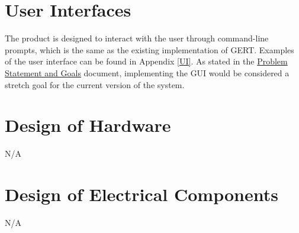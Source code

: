 \documentclass[12pt, titlepage]{article}
\begin{document}



\section{User Interfaces}
The product is designed to interact with the user through command-line prompts, which is the same as the existing implementation of GERT. Examples of the user interface can be found in Appendix \ref{UI}.
As stated in the \href{https://github.com/paezha/PyERT-BLACK/blob/main/docs/ProblemStatementAndGoals/ProblemStatement.pdf}{Problem Statement and Goals} \citep{ProblemStatement} document, implementing the GUI would be considered a stretch goal for the current version of the system.



\section{Design of Hardware}
N/A


\section{Design of Electrical Components}
N/A

\end{document}
